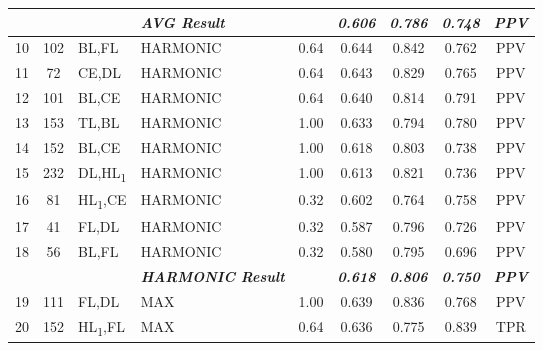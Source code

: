 \begin{table}[H]
{\begin{tabular}{ccl|l|c|c|c|c|c|}
   &
    \textit{\textbf{}} &
     &
    \textit{\textbf{AVG Result}} &
     &
    \textit{\textbf{0.606}} &
    \textit{\textbf{0.786}} &
    \textit{\textbf{0.748}} &
    \textit{\textbf{PPV}} \\ \hline
  \multicolumn{1}{|c|}{10} &
    \multicolumn{1}{c|}{102} &
    BL,FL &
    HARMONIC &
    0.64 &
    0.644 &
    0.842 &
    0.762 &
    PPV \\ \hline
  \multicolumn{1}{|c|}{11} &
    \multicolumn{1}{c|}{72} &
    CE,DL &
    HARMONIC &
    0.64 &
    0.643 &
    0.829 &
    0.765 &
    PPV \\ \hline
  \multicolumn{1}{|c|}{12} &
    \multicolumn{1}{c|}{101} &
    BL,CE &
    HARMONIC &
    0.64 &
    0.640 &
    0.814 &
    0.791 &
    PPV \\ \hline
  \multicolumn{1}{|c|}{13} &
    \multicolumn{1}{c|}{153} &
    TL,BL &
    HARMONIC &
    1.00 &
    0.633 &
    0.794 &
    0.780 &
    PPV \\ \hline
  \multicolumn{1}{|c|}{14} &
    \multicolumn{1}{c|}{152} &
    BL,CE &
    HARMONIC &
    1.00 &
    0.618 &
    0.803 &
    0.738 &
    PPV \\ \hline
  \multicolumn{1}{|c|}{15} &
    \multicolumn{1}{c|}{232} &
    DL,HL\textsubscript{1} &
    HARMONIC &
    1.00 &
    0.613 &
    0.821 &
    0.736 &
    PPV \\ \hline
  \multicolumn{1}{|c|}{16} &
    \multicolumn{1}{c|}{81} &
    HL\textsubscript{1},CE &
    HARMONIC &
    0.32 &
    0.602 &
    0.764 &
    0.758 &
    PPV \\ \hline
  \multicolumn{1}{|c|}{17} &
    \multicolumn{1}{c|}{41} &
    FL,DL &
    HARMONIC &
    0.32 &
    0.587 &
    0.796 &
    0.726 &
    PPV \\ \hline
  \multicolumn{1}{|c|}{18} &
    \multicolumn{1}{c|}{56} &
    BL,FL &
    HARMONIC &
    0.32 &
    0.580 &
    0.795 &
    0.696 &
    PPV \\ \hline
   &
    \textit{\textbf{}} &
     &
    \textit{\textbf{HARMONIC Result}} &
     &
    \textit{\textbf{0.618}} &
    \textit{\textbf{0.806}} &
    \textit{\textbf{0.750}} &
    \textit{\textbf{PPV}} \\ \hline
  \multicolumn{1}{|c|}{19} &
    \multicolumn{1}{c|}{111} &
    FL,DL &
    MAX &
    1.00 &
    0.639 &
    0.836 &
    0.768 &
    PPV \\ \hline
  \multicolumn{1}{|c|}{20} &
    \multicolumn{1}{c|}{152} &
    HL\textsubscript{1},FL &
    MAX &
    0.64 &
    0.636 &
    0.775 &
    0.839 &
    TPR \\ \hline

\end{tabular}}
\end{table}
